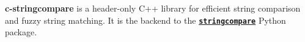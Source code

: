 \label{index_md_README}%
%
 {\bfseries{c-\/stringcompare}} is a header-\/only C++ library for efficient string comparison and fuzzy string matching. It is the backend to the \href{https://github.com/olivierBinette/stringcompare}{\texttt{ {\bfseries{stringcompare}}}} Python package. 
